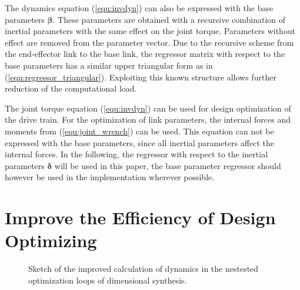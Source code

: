\documentclass{svproc}
\newcommand{\bm}[1]{\boldsymbol{#1}}
\begin{document}
The dynamics equation (\ref{equ:invdyn}) can also be expressed with the base parameters $\bm{\beta}$.
These parameters are obtained with a recursive combination of inertial parameters with the same effect on the joint torque.
Parameters without effect are removed from the parameter vector.
Due to the recursive scheme from the end-effector link to the base link, the regressor matrix with respect to the base parameters has a similar upper triangular form as in (\ref{equ:regressor_triangular}).
Exploiting this known structure allows further reduction of the computational load.

The joint torque equation (\ref{equ:invdyn}) can be used for design optimization of the drive train.
For the optimization of link parameters, the internal forces and moments from (\ref{equ:joint_wrench}) can be used. This equation can not be expressed with the base parameters, since all inertial parameters affect the internal forces.
In the following, the regressor with respect to the inertial parameters $\bm{\delta}$ will be used in this paper, the base parameter regressor should however be used in the implementation wherever possible.

\section{Improve the Efficiency of Design Optimizing}
\label{sec:DesOptImprove}




\begin{figure}[htb]
    
    \caption{Sketch of the improved calculation of dynamics in the nestested optimization loops of dimensional synthesis.}
    \label{fig:dimsynth_dyn_plin}
\end{figure} 
\end{document}
